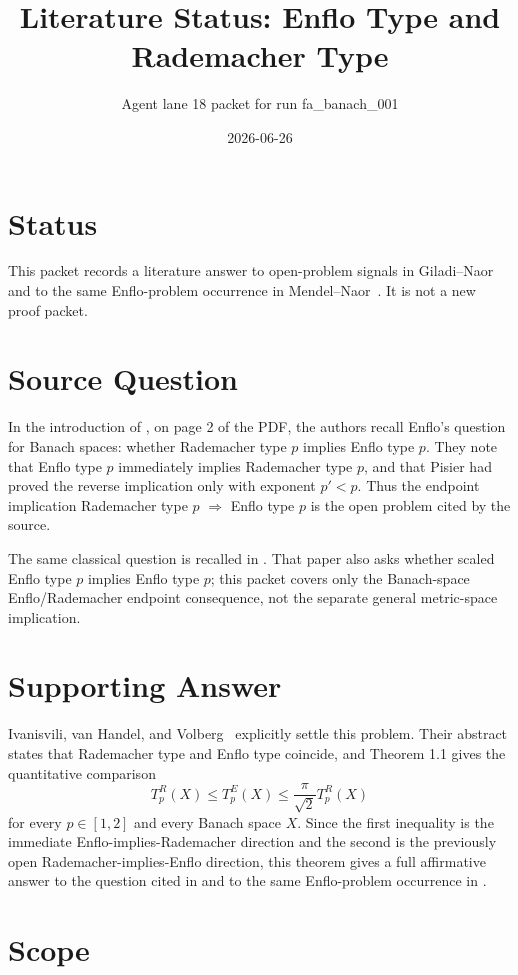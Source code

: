 \documentclass[11pt]{article}
\title{Literature Status: Enflo Type and Rademacher Type}
\author{Agent lane 18 packet for run fa\_banach\_001}
\date{2026-06-26}
\begin{document}
\maketitle

\section*{Status}

This packet records a literature answer to open-problem signals in
Giladi--Naor~\cite{GN2010} and to the same Enflo-problem occurrence in
Mendel--Naor~\cite{MN2005}. It is not a new proof packet.

\section*{Source Question}

In the introduction of \cite{GN2010}, on page 2 of the PDF, the authors recall
Enflo's question for Banach spaces: whether Rademacher type $p$ implies Enflo
type $p$. They note that Enflo type $p$ immediately implies Rademacher type
$p$, and that Pisier had proved the reverse implication only with exponent
$p'<p$. Thus the endpoint implication Rademacher type $p$ $\Rightarrow$ Enflo
type $p$ is the open problem cited by the source.

The same classical question is recalled in \cite{MN2005}. That paper also
asks whether scaled Enflo type $p$ implies Enflo type $p$; this packet covers
only the Banach-space Enflo/Rademacher endpoint consequence, not the separate
general metric-space implication.

\section*{Supporting Answer}

Ivanisvili, van Handel, and Volberg~\cite{IVV2020} explicitly settle this
problem. Their abstract states that Rademacher type and Enflo type coincide,
and Theorem 1.1 gives the quantitative comparison
\[
  T_p^R(X) \le T_p^E(X) \le \frac{\pi}{\sqrt{2}} T_p^R(X)
\]
for every $p\in[1,2]$ and every Banach space $X$. Since the first inequality
is the immediate Enflo-implies-Rademacher direction and the second is the
previously open Rademacher-implies-Enflo direction, this theorem gives a full
affirmative answer to the question cited in \cite{GN2010} and to the same
Enflo-problem occurrence in \cite{MN2005}.

\section*{Scope}
\end{document}
